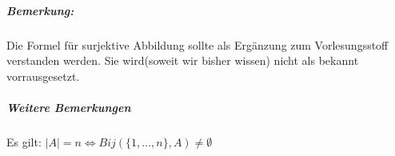 \subparagraph*{Bemerkung:} Die Formel für surjektive Abbildung sollte als Ergänzung zum Vorlesungsstoff verstanden werden. 
Sie wird(soweit wir bisher wissen) nicht als bekannt vorrausgesetzt.

\subparagraph{Weitere Bemerkungen}
Es gilt:
$ |A| = n \Longleftrightarrow Bij( \{1, ... , n\},A) \neq \emptyset$
